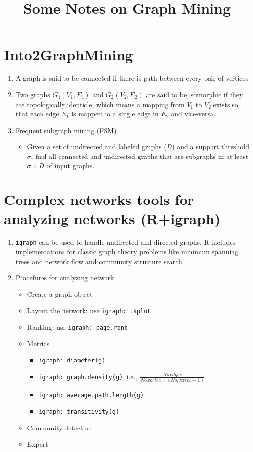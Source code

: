 \documentclass[14pt]{article}
\begin{document}
\title{Some Notes on Graph Mining}
\maketitle

\section{Into2GraphMining}
\begin{enumerate}
 \item A graph is said to be connected if there is path between every pair of vertices
 \item Two graphs $G_1(V_1,E_1)$ and $G_2(V_2,E_2)$ are said to be isomorphic if they are topologically identicle, which means a mapping from $V_1$ to $V_2$ exists so that each edge $E_1$ is mapped to a single edge in $E_2$ and vice-versa.
 \item Frequent subgraph mining (FSM)
  \begin{itemize}
   \item Given a set of undirected and labeled graphs ($D$) and a support threshold $\sigma$, find all connected and undirected graphs that are subgraphs in at least $\sigma \times D$ of input graphs.
  \end{itemize}
\end{enumerate}

\section{Complex networks tools for analyzing networks (R+igraph)}
\begin{enumerate}
 \item \texttt{igraph} can be used to handle undirected and directed graphs. It includes implementations for classic graph theory problems like minimum spanning trees and network flow and community structure search.
 \item Procefures for analyzing network
  \begin{itemize}
   \item Create a graph object
   \item Layout the network: use \texttt{igraph: tkplot}
   \item Ranking: use  \texttt{igraph: page.rank}
   \item Metrics
    \begin{itemize}
     \item \texttt{igraph: diameter(g)}
     \item \texttt{igraph: graph.density(g)}, i.e., $\frac{No.edges}{No.vertex \times (No.vertex-1)}$
     \item \texttt{igraph: average.path.length(g)}
     \item \texttt{igraph: transitivity(g)}
    \end{itemize}
   \item Community detection
   \item Export
  \end{itemize}

\end{enumerate}
\end{document}
